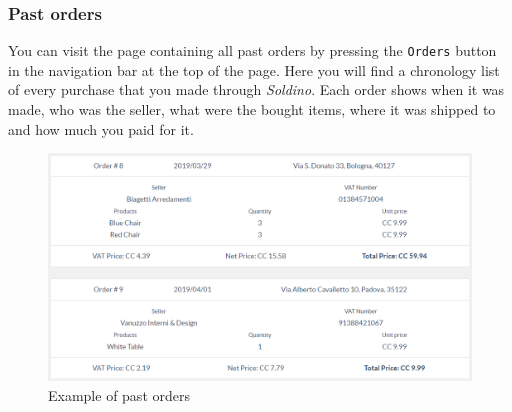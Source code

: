 	\subsubsection{Past orders}
	You can visit the page containing all past orders by pressing the \texttt{Orders} 
	button in the navigation bar at the top of the page.
%
	Here you will find a chronology list of every purchase that you made through 
	\textit{Soldino}. Each order shows when it was made, who was the seller, 
	what were the bought items, where it was shipped to and how much you paid for it.
	\begin{figure}[H]
		\includegraphics[width=15cm]{res/images/past_orders.png}
		\centering
		\caption{Example of past orders}
	\end{figure}
